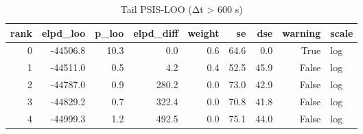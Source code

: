 \begin{table}
\caption{Tail PSIS-LOO (Δt > 600 s)}
\label{tab:tailPSISI600s}
\begin{tabular}{rrrrrrrrl}
\toprule
rank & elpd_loo & p_loo & elpd_diff & weight & se & dse & warning & scale \\
\midrule
0 & -44506.8 & 10.3 & 0.0 & 0.6 & 64.6 & 0.0 & True & log \\
1 & -44511.0 & 0.5 & 4.2 & 0.4 & 52.5 & 45.9 & False & log \\
2 & -44787.0 & 0.9 & 280.2 & 0.0 & 73.0 & 42.9 & False & log \\
3 & -44829.2 & 0.7 & 322.4 & 0.0 & 70.8 & 41.8 & False & log \\
4 & -44999.3 & 1.2 & 492.5 & 0.0 & 75.1 & 44.0 & False & log \\
\bottomrule
\end{tabular}
\end{table}
